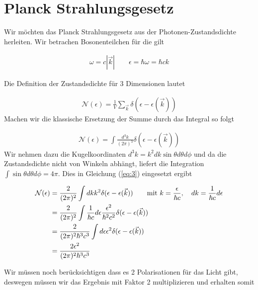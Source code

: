 
\usepackage{amsmath} 





\section*{Planck Strahlungsgesetz}

Wir möchten das Planck Strahlungsgesetz aus der Photonen-Zustandsdichte herleiten. Wir betrachen Bosonenteilchen  für die gilt

\begin{align}
  \label{eq:1}
  \omega = c |\vec k| \qquad \epsilon = \hbar \omega = \hbar c k
\end{align}

Die Definition der Zustandsdichte für 3 Dimensionen lautet

\begin{align}
  \label{eq:2}
  \mathcal N (\epsilon) = \frac{1}{V}\sum_{\vec k} \delta(\epsilon - \epsilon(\vec k))
\end{align}
Machen wir die klassische Ersetzung der Summe durch das Integral so folgt

\begin{align}
  \label{eq:3}
  \mathcal N (\epsilon) = \int \frac{d^3k}{(2\pi)^3} \delta(\epsilon - \epsilon(\vec k))
\end{align}
Wir nehmen dazu die Kugelkoordinaten \(d^3k = k^2dk \sin\theta d\theta d\phi\) und da die Zustandsdichte nicht von Winkeln abhängt, liefert die Integration \( \int \sin\theta d\theta d\phi=4\pi\). Dies in Gleichung (\ref{eq:3}) eingesetzt ergibt

\begin{align}
  \label{eq:4}
   \mathcal N (\epsilon) &= \frac{2}{(2\pi)^2}  \int dk k^2 \delta(\epsilon - \epsilon(\vec k)) \qquad \text{mit }k=\frac{\epsilon}{\hbar c},\quad dk = \frac{1}{\hbar c}d\epsilon \notag\\
 &= \frac{2}{(2\pi)^2}  \int \frac{1}{\hbar c}d\epsilon \frac{\epsilon^2}{\hbar^2 c^2} \delta(\epsilon - \epsilon(\vec k)) \notag\\
&= \frac{2}{(2\pi)^2 \hbar^3 c^3}  \int d\epsilon \epsilon^2 \delta(\epsilon - \epsilon(\vec k)) \notag\\
&= \frac{2 \epsilon^2}{(2\pi)^2 \hbar^3 c^3} 
\end{align}

Wir müssen noch berücksichtigen dass es 2 Polarisationen für das Licht gibt, deswegen müssen wir das Ergebnis mit Faktor 2 multiplizieren und erhalten somit

